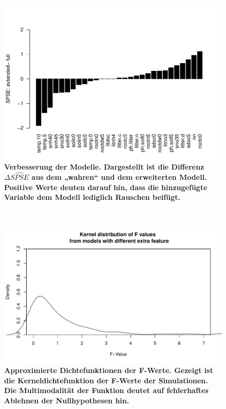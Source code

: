 \begin{figure}[htb]
	\centering
	\includegraphics[width=\textwidth]{fig/simul/delta-spse.pdf}
	\caption{\bf{Verbesserung der Modelle.} 
		Dargestellt ist die Differenz $\Delta \widehat{SPSE}$ aus dem „wahren“ und dem erweiterten Modell.
		Positive Werte deuten darauf hin, dass die hinzugefügte Variable dem Modell lediglich Rauschen beifügt.
	}
	\label{fig-simul-delta-spse}
\end{figure}
\\
\begin{figure}[htbp]
	\centering
	\includegraphics[width=\textwidth]{fig/simul/kernel.pdf}
	\caption{\bf{Approximierte Dichtefunktionen der F-Werte.} 
		Gezeigt ist die Kerneldichtefunktion der F-Werte der Simulationen.
		Die Multimodalität der Funktion deutet auf fehlerhaftes Ablehnen der Nullhypothesen hin.
	}
	\label{fig-simul-kernel}
\end{figure}

